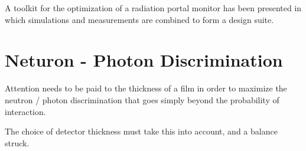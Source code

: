 A toolkit for the optimization of a radiation portal monitor has been presented in which simulations and measurements are combined to form a design suite.

\section{Neturon - Photon Discrimination}
Attention needs to be paid to the thickness of a film in order to maximize the neutron / photon discrimination that goes simply beyond the probability of interaction.

The choice of detector thickness must take this into account, and a balance struck.

